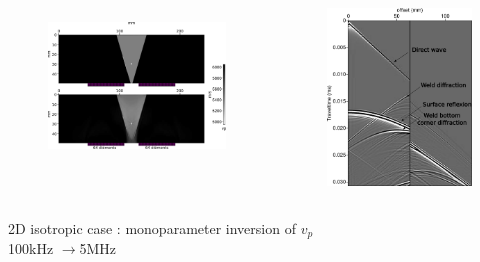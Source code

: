 \documentclass[11pt,xcolor=x11names,compress, notes=show]{beamer}%
\begin{document}
\begin{frame}
	\begin{columns}
		\begin{figure}[!h]
			\flushleft
			\includegraphics[width=\textwidth]{img/vp.png}\\[0.5cm]
		\end{figure}
		\vline
		\begin{figure}[!h]
			\flushright
			\vspace{-1cm}
			\includegraphics[width=\textwidth]{img/ondes.png}
		\end{figure}
	\end{columns}
	\begin{center}
			2D isotropic case :  monoparameter inversion of $v_{p}$\\ 100kHz $\rightarrow$5MHz
	\end{center}


\end{frame}
\end{document}
